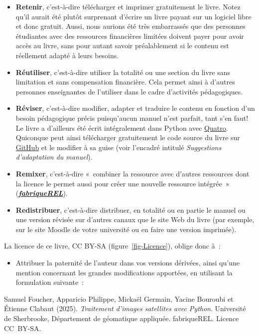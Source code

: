 \documentclass[
  french,
  11pt,
  letterpaper,
  open=any,
  twoside=false,
  french]{scrbook}
\providecommand{\tightlist}{%
  \setlength{\itemsep}{0pt}\setlength{\parskip}{0pt}}
\begin{document}
\begin{itemize}
\item
  \textbf{Retenir}, c'est-à-dire télécharger et imprimer gratuitement le
  livre. Notez qu'il aurait été plutôt surprenant d'écrire un livre
  payant sur un logiciel libre et donc gratuit. Aussi, nous aurions été
  très embarrassés que des personnes étudiantes avec des ressources
  financières limitées doivent payer pour avoir accès au livre, sans
  pour autant savoir préalablement si le contenu est réellement adapté à
  leurs besoins.
\item
  \textbf{Réutiliser}, c'est-à-dire utiliser la totalité ou une section
  du livre sans limitation et sans compensation financière. Cela permet
  ainsi à d'autres personnes enseignantes de l'utiliser dans le cadre
  d'activités pédagogiques.
\item
  \textbf{Réviser}, c'est-à-dire modifier, adapter et traduire le
  contenu en fonction d'un besoin pédagogique précis puisqu'aucun manuel
  n'est parfait, tant s'en faut! Le livre a d'ailleurs été écrit
  intégralement dans Python avec \href{https://quarto.org/}{Quatro}.
  Quiconque peut ainsi télécharger gratuitement le code source du livre
  sur
  \href{https://github.com/serie-python-tele/TraitementImagesPythonVol1}{GitHub}
  et le modifier à sa guise (voir l'encadré intitulé \emph{Suggestions
  d'adaptation du manuel}).
\item
  \textbf{Remixer}, c'est-à-dire «~combiner la ressource avec d'autres
  ressources dont la licence le permet aussi pour créer une nouvelle
  ressource intégrée~»
  (\href{https://fabriquerel.org/rel/}{\textbf{\emph{fabriqueREL}}}).
\item
  \textbf{Redistribuer}, c'est-à-dire distribuer, en totalité ou en
  partie le manuel ou une version révisée sur d'autres canaux que le
  site Web du livre (par exemple, sur le site Moodle de votre université
  ou en faire une version imprimée).
\end{itemize}

La licence de ce livre, CC BY-SA (figure~\ref{fig-Licence}), oblige donc
à~:

\begin{itemize}
\tightlist
\item
  Attribuer la paternité de l'auteur dans vos versions dérivées, ainsi
  qu'une mention concernant les grandes modifications apportées, en
  utilisant la formulation suivante~:
\end{itemize}

Samuel Foucher, Apparicio Philippe, Mickaël Germain, Yacine Bouroubi et
Étienne Clabaut (2025). \emph{Traitement d'images satellites avec
Python}. Université de Sherbrooke, Département de géomatique appliquée.
fabriqueREL. Licence CC~BY-SA.
\end{document}
